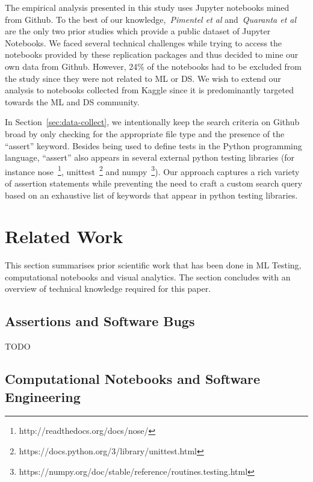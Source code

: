 The empirical analysis presented in this study uses Jupyter notebooks mined from Github. To the best of our knowledge,~\emph{Pimentel et al} and~\emph{Quaranta et al} are the only two prior studies which provide a public dataset of Jupyter Notebooks. We faced several technical challenges while trying to access the notebooks provided by these replication packages and thus decided to mine our own data from Github. However, 24\% of the notebooks had to be excluded from the study since they were not related to ML or DS. We wish to extend our analysis to notebooks collected from Kaggle since it is predominantly targeted towards the ML and DS community.

In Section~\ref{sec:data-collect}, we intentionally keep the search criteria on Github broad by only checking for the appropriate file type and the presence of the ``assert'' keyword. Besides being used to define tests in the Python programming language, ``assert'' also appears in several external python testing libraries (for instance nose~\footnote{http://readthedocs.org/docs/nose/}, unittest~\footnote{https://docs.python.org/3/library/unittest.html} and numpy~\footnote{https://numpy.org/doc/stable/reference/routines.testing.html}). Our approach captures a rich variety of assertion statements while preventing the need to craft a custom search query based on an exhaustive list of keywords that appear in python testing libraries.

\section{Related Work}\label{sec:related}


This section summarises prior scientific work that has been done in ML
Testing, computational notebooks and visual analytics. The section
concludes with an overview of technical knowledge required for this
paper.

\subsection{Assertions and Software Bugs}
 TODO

\subsection{Computational Notebooks and Software Engineering}\label{sec:notebooks}


